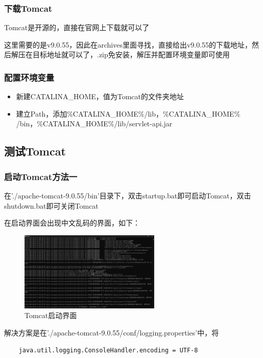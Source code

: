 \documentclass[UTF8,12pt]{article}
\begin{document}
\subsubsection{下载Tomcat}
Tomcat是开源的，直接在官网上下载就可以了

这里需要的是v9.0.55，因此在archives里面寻找，直接给出v9.0.55的下载地址，然后解压在目标地址就可以了，.zip免安装，解压并配置环境变量即可使用

\subsubsection{配置环境变量}
\begin{itemize}
    \item 新建CATALINA\_HOME，值为Tomcat的文件夹地址
    \item 建立Path，添加\%CATALINA\_HOME\%/lib，\%CATALINA\_HOME\%
    /bin，\%CATALINA\_HOME\%/lib/servlet-api.jar
\end{itemize}

\subsection{测试Tomcat}
\subsubsection{启动Tomcat方法一}
在'./apache-tomcat-9.0.55/bin'目录下，双击startup.bat即可启动Tomcat，双击shutdown.bat即可关闭Tomcat

在启动界面会出现中文乱码的界面，如下：
\begin{figure}[htbp]
    \centering
    \includegraphics[width=0.6\textwidth]{imgs/1.png}
    \caption{Tomcat启动界面}
\end{figure}

解决方案是在'./apache-tomcat-9.0.55/conf/logging.properties'中，将

\begin{lstlisting}
    java.util.logging.ConsoleHandler.encoding = UTF-8
\end{lstlisting}
\end{document}
